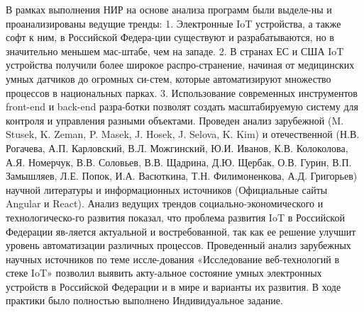 
В рамках выполнения НИР на основе анализа программ были выделе-ны и проанализированы ведущие тренды:
1.	Электронные IoT устройства, а также софт к ним, в Российской Федера-ции существуют и разрабатываются, но в значительно меньшем мас-штабе, чем на западе. 
2.	В странах ЕС и США IoT устройства получили более широкое распро-странение, начиная от медицинских умных датчиков до огромных си-стем, которые автоматизируют множество процессов в национальных парках.
3.	Использование современных инструментов front-end и back-end разра-ботки позволят создать масштабируемую систему для контроля и управления разными объектами.
Проведен анализ зарубежной (M. Stusek, K. Zeman, P. Masek, J. Hosek, J. Selova, K. Kim) и отечественной (Н.В. Рогачева, А.П. Карловский, В.Л. Можгинский, Ю.И. Иванов, К.В. Колоколова, А.Я. Номерчук, В.В. Соловьев, В.В. Щадрина, Д.Ю. Щербак, О.В. Гурин, В.П. Замышляев, Л.Е. Попок, И.А. Васюткина, Т.Н. Филимоненкова, А.Д. Григорьев) научной литературы и информационных источников (Официальные сайты Angular и React).
Анализ ведущих трендов социально-экономического и технологическо-го развития показал, что проблема развития IoT в Российской Федерации яв-ляется актуальной и востребованной, так как ее решение улучшит уровень автоматизации различных процессов.
Проведенный анализ зарубежных научных источников по теме иссле-дования «Исследование веб-технологий в стеке IoT» позволил выявить акту-альное состояние умных электронных устройств в Российской Федерации и в мире и варианты их развития. 
В ходе практики было полностью выполнено Индивидуальное задание.

\clearpage
